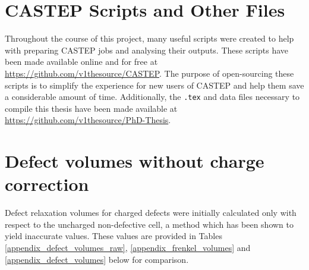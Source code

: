 \documentclass[a4paper,12pt,twoside]{report}
\begin{document}
\chapter{CASTEP Scripts and Other Files}
\label{castep_scripts}

Throughout the course of this project, many useful scripts were created to help with preparing CASTEP jobs and analysing their outputs. These scripts have been made available online and for free at \href{https://github.com/v1thesource/CASTEP}{https://github.com/v1thesource/CASTEP}. The purpose of open-sourcing these scripts is to simplify the experience for new users of CASTEP and help them save a considerable amount of time. Additionally, the \texttt{.tex} and data files necessary to compile this thesis have been made available at \href{https://github.com/v1thesource/PhD-Thesis}{https://github.com/v1thesource/PhD-Thesis}.

\chapter{Defect volumes without charge correction} \label{uncorrected_volumes}

Defect relaxation volumes for charged defects were initially calculated only with respect to the uncharged non-defective cell, a method which has been shown to yield inaccurate values. These values are provided in Tables \ref{appendix_defect_volumes_raw}, \ref{appendix_frenkel_volumes} and \ref{appendix_defect_volumes} below for comparison.
\end{document}
